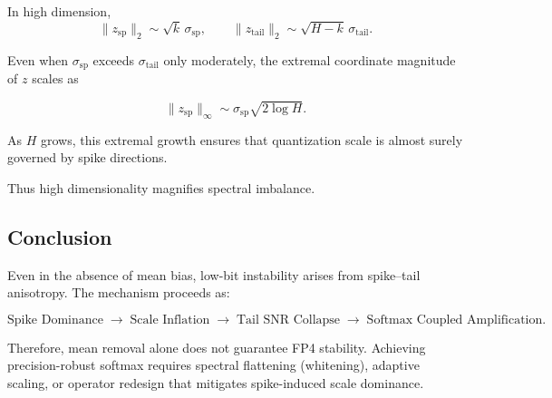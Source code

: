 In high dimension,
\[
\|z_{\mathrm{sp}}\|_2
\sim
\sqrt{k}\,\sigma_{\mathrm{sp}},
\qquad
\|z_{\mathrm{tail}}\|_2
\sim
\sqrt{H-k}\,\sigma_{\mathrm{tail}}.
\]

Even when $\sigma_{\mathrm{sp}}$ exceeds $\sigma_{\mathrm{tail}}$
only moderately,
the extremal coordinate magnitude of $z$ scales as

\[
\|z_{\mathrm{sp}}\|_\infty
\sim
\sigma_{\mathrm{sp}}\sqrt{2\log H}.
\]

As $H$ grows,
this extremal growth ensures that quantization scale
is almost surely governed by spike directions.

Thus high dimensionality magnifies spectral imbalance.

\subsection{Conclusion}

Even in the absence of mean bias,
low-bit instability arises from spike--tail anisotropy.
The mechanism proceeds as:

\[
\text{Spike Dominance}
\;\rightarrow\;
\text{Scale Inflation}
\;\rightarrow\;
\text{Tail SNR Collapse}
\;\rightarrow\;
\text{Softmax Coupled Amplification}.
\]

Therefore,
mean removal alone does not guarantee FP4 stability.
Achieving precision-robust softmax requires
spectral flattening (whitening),
adaptive scaling,
or operator redesign that mitigates spike-induced scale dominance.